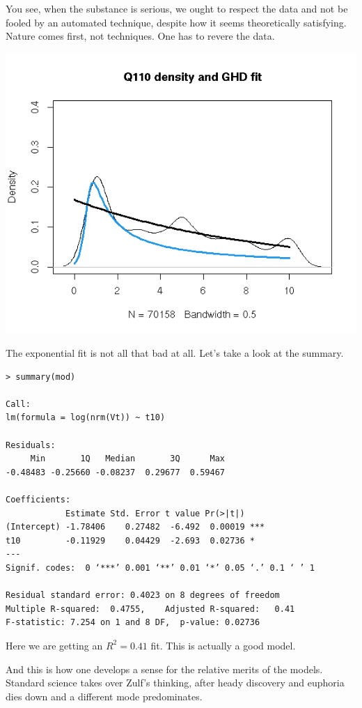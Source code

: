 \documentclass{amsart}
\begin{document}
You see, when the substance is serious, we ought to respect the data and not be fooled by an automated technique, despite how it seems theoretically satisfying.  Nature comes first, not techniques.  One has to revere the data.

\includegraphics[scale=0.8]{fits-q110.jpeg}

The exponential fit is not all that bad at all.  Let's take a look at the summary.

\begin{verbatim}
> summary(mod)

Call:
lm(formula = log(nrm(Vt)) ~ t10)

Residuals:
     Min       1Q   Median       3Q      Max 
-0.48483 -0.25660 -0.08237  0.29677  0.59467 

Coefficients:
            Estimate Std. Error t value Pr(>|t|)    
(Intercept) -1.78406    0.27482  -6.492  0.00019 ***
t10         -0.11929    0.04429  -2.693  0.02736 *  
---
Signif. codes:  0 ‘***’ 0.001 ‘**’ 0.01 ‘*’ 0.05 ‘.’ 0.1 ‘ ’ 1

Residual standard error: 0.4023 on 8 degrees of freedom
Multiple R-squared:  0.4755,	Adjusted R-squared:   0.41 
F-statistic: 7.254 on 1 and 8 DF,  p-value: 0.02736
\end{verbatim}

Here we are getting an $R^2=0.41$ fit.  This is actually a good model. 

And this is how one develops a sense for the relative merits of the models.  Standard science takes over Zulf's thinking, after heady discovery and euphoria dies down and a different mode predominates. 
\end{document}
